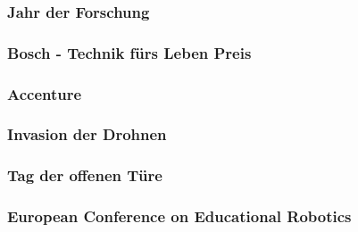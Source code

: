     \subsubsection{Jahr der Forschung}

    \subsubsection{Bosch - Technik fürs Leben Preis}

    \subsubsection{Accenture}

    \subsubsection{Invasion der Drohnen}

    \subsubsection{Tag der offenen Türe}

    \subsubsection{European Conference on Educational Robotics}
